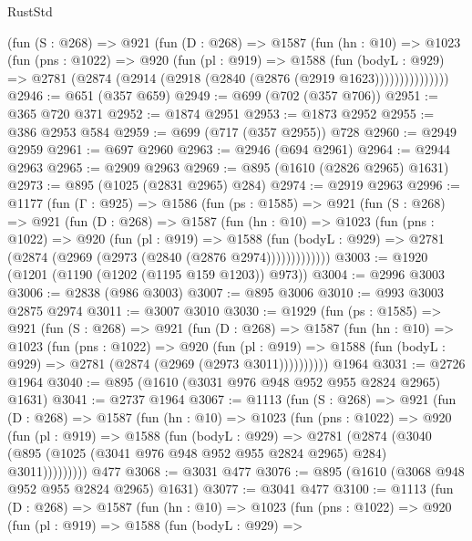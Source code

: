 \begin{lexlean}{RustStd}
\begin{coremodule}
          (fun (S : @268) =>
          @921
            (fun (D : @268) =>
            @1587
              (fun (hn : @10) =>
              @1023
                (fun (pns : @1022) =>
                @920
                  (fun (pl : @919) =>
                  @1588
                    (fun (bodyL : @929) =>
                    @2781 (@2874 (@2914 (@2918 (@2840 (@2876 (@2919 @1623)))))))))))))))
@2946 := @651 (@357 @659)
@2949 := @699 (@702 (@357 @706))
@2951 := @365 @720 @371
@2952 := @1874 @2951
@2953 := @1873 @2952
@2955 := @386 @2953 @584
@2959 := @699 (@717 (@357 @2955)) @728
@2960 := @2949 @2959
@2961 := @697 @2960
@2963 := @2946 (@694 @2961)
@2964 := @2944 @2963
@2965 := @2909 @2963
@2969 := @895 (@1610 (@2826 @2965) @1631)
@2973 := @895 (@1025 (@2831 @2965) @284)
@2974 := @2919 @2963
@2996 := @1177
    (fun (Γ : @925) =>
    @1586
      (fun (ps : @1585) =>
      @921
        (fun (S : @268) =>
        @921
          (fun (D : @268) =>
          @1587
            (fun (hn : @10) =>
            @1023
              (fun (pns : @1022) =>
              @920
                (fun (pl : @919) =>
                @1588
                  (fun (bodyL : @929) => @2781 (@2874 (@2969 (@2973 (@2840 (@2876 @2974)))))))))))))
@3003 := @1920 (@1201 (@1190 (@1202 (@1195 @159 @1203)) @973))
@3004 := @2996 @3003
@3006 := @2838 (@986 @3003)
@3007 := @895 @3006
@3010 := @993 @3003 @2875 @2974
@3011 := @3007 @3010
@3030 := @1929
    (fun (ps : @1585) =>
    @921
      (fun (S : @268) =>
      @921
        (fun (D : @268) =>
        @1587
          (fun (hn : @10) =>
          @1023
            (fun (pns : @1022) =>
            @920
              (fun (pl : @919) =>
              @1588 (fun (bodyL : @929) => @2781 (@2874 (@2969 (@2973 @3011))))))))))
    @1964
@3031 := @2726 @1964
@3040 := @895 (@1610 (@3031 @976 @948 @952 @955 @2824 @2965) @1631)
@3041 := @2737 @1964
@3067 := @1113
    (fun (S : @268) =>
    @921
      (fun (D : @268) =>
      @1587
        (fun (hn : @10) =>
        @1023
          (fun (pns : @1022) =>
          @920
            (fun (pl : @919) =>
            @1588
              (fun (bodyL : @929) =>
              @2781
                (@2874
                  (@3040 (@895 (@1025 (@3041 @976 @948 @952 @955 @2824 @2965) @284) @3011)))))))))
    @477
@3068 := @3031 @477
@3076 := @895 (@1610 (@3068 @948 @952 @955 @2824 @2965) @1631)
@3077 := @3041 @477
@3100 := @1113
    (fun (D : @268) =>
    @1587
      (fun (hn : @10) =>
      @1023
        (fun (pns : @1022) =>
        @920
          (fun (pl : @919) =>
          @1588
            (fun (bodyL : @929) =>

\end{coremodule}
\end{lexlean}
